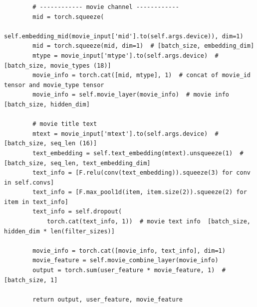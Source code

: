\begin{spacing}{1.5}
\begin{lstlisting}
        # ------------ movie channel ------------
        mid = torch.squeeze(
            self.embedding_mid(movie_input['mid'].to(self.args.device)), dim=1)
        mid = torch.squeeze(mid, dim=1)  # [batch_size, embedding_dim]
        mtype = movie_input['mtype'].to(self.args.device)  # [batch_size, movie_types (18)]
        movie_info = torch.cat([mid, mtype], 1)  # concat of movie_id tensor and movie_type tensor
        movie_info = self.movie_layer(movie_info)  # movie info  [batch_size, hidden_dim]
        
        # movie title text
        mtext = movie_input['mtext'].to(self.args.device)  # [batch_size, seq_len (16)]
        text_embedding = self.text_embedding(mtext).unsqueeze(1)  # [batch_size, seq_len, text_embedding_dim]
        text_info = [F.relu(conv(text_embedding)).squeeze(3) for conv in self.convs]
        text_info = [F.max_pool1d(item, item.size(2)).squeeze(2) for item in text_info]
        text_info = self.dropout(
            torch.cat(text_info, 1))  # movie text info  [batch_size, hidden_dim * len(filter_sizes)]
        
        movie_info = torch.cat([movie_info, text_info], dim=1)
        movie_feature = self.movie_combine_layer(movie_info)
        output = torch.sum(user_feature * movie_feature, 1)  # [batch_size, 1]
        
        return output, user_feature, movie_feature
\end{lstlisting}\par
\end{spacing}

\clearpage


\printbibliography%
